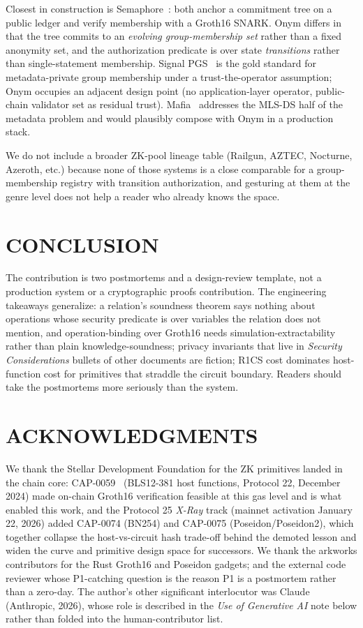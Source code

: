 \documentclass{IEEEcsmag}
\begin{document}
Closest in construction is Semaphore~\cite{semaphore}: both anchor a commitment tree on a public ledger and verify membership with a Groth16 SNARK. Onym differs in that the tree commits to an \emph{evolving group-membership set} rather than a fixed anonymity set, and the authorization predicate is over state \emph{transitions} rather than single-statement membership. Signal PGS~\cite{chase2020} is the gold standard for metadata-private group membership under a trust-the-operator assumption; Onym occupies an adjacent design point (no application-layer operator, public-chain validator set as residual trust). Mafia~\cite{mafia2025} addresses the MLS-DS half of the metadata problem and would plausibly compose with Onym in a production stack.

We do not include a broader ZK-pool lineage table (Railgun, AZTEC, Nocturne, Azeroth, etc.) because none of those systems is a close comparable for a group-membership registry with transition authorization, and gesturing at them at the genre level does not help a reader who already knows the space.


\section{CONCLUSION}

The contribution is two postmortems and a design-review template, not a production system or a cryptographic proofs contribution. The engineering takeaways generalize: a relation's soundness theorem says nothing about operations whose security predicate is over variables the relation does not mention, and operation-binding over Groth16 needs simulation-extractability rather than plain knowledge-soundness; privacy invariants that live in \emph{Security Considerations} bullets of other documents are fiction; R1CS cost dominates host-function cost for primitives that straddle the circuit boundary. Readers should take the postmortems more seriously than the system.\vspace*{-8pt}


\section{ACKNOWLEDGMENTS}

We thank the Stellar Development Foundation for the ZK primitives landed in the chain core: CAP-0059~\cite{cap0059} (BLS12-381 host functions, Protocol 22, December 2024) made on-chain Groth16 verification feasible at this gas level and is what enabled this work, and the Protocol 25 \emph{X-Ray} track (mainnet activation January 22, 2026) added CAP-0074 (BN254) and CAP-0075 (Poseidon/Poseidon2), which together collapse the host-vs-circuit hash trade-off behind the demoted lesson and widen the curve and primitive design space for successors. We thank the arkworks contributors for the Rust Groth16 and Poseidon gadgets; and the external code reviewer whose P1-catching question is the reason P1 is a postmortem rather than a zero-day. The author's other significant interlocutor was Claude (Anthropic, 2026), whose role is described in the \emph{Use of Generative AI} note below rather than folded into the human-contributor list.
\end{document}
